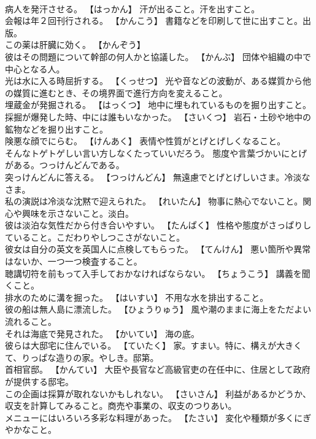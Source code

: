 \documentclass[8pt]{extreport}
\begin{document}
\begin{CJK}{UTF8}{min}
\\	病人を発汗させる。	【はっかん】 汗が出ること。汗を出すこと。
\\	会報は年２回刊行される。	【かんこう】 書籍などを印刷して世に出すこと。出版。
\\	この薬は肝臓に効く。	【かんぞう】 
\\	彼はその問題について幹部の何人かと協議した。	【かんぶ】 団体や組織の中で中心となる人。
\\	光は水に入る時屈折する。	【くっせつ】 光や音などの波動が、ある媒質から他の媒質に進むとき、その境界面で進行方向を変えること。
\\	埋蔵金が発掘される。	【はっくつ】 地中に埋もれているものを掘り出すこと。
\\	採掘が爆発した時、中には誰もいなかった。	【さいくつ】 岩石・土砂や地中の鉱物などを掘り出すこと。
\\	険悪な顔でにらむ。	【けんあく】 表情や性質がとげとげしくなること。
\\	そんなトゲトゲしい言い方しなくたっていいだろう。	態度や言葉づかいにとげがある。つっけんどんである。
\\	突っけんどんに答える。	【つっけんどん】 無遠慮でとげとげしいさま。冷淡なさま。
\\	私の演説は冷淡な沈黙で迎えられた。	【れいたん】 物事に熱心でないこと。関心や興味を示さないこと。淡白。
\\	彼は淡泊な気性だから付き合いやすい。	【たんぱく】 性格や態度がさっぱりしていること。こだわりやしつこさがないこと。
\\	彼女は自分の英文を英国人に点検してもらった。	【てんけん】 悪い箇所や異常はないか、一つ一つ検査すること。
\\	聴講切符を前もって入手しておかなければならない。	【ちょうこう】 講義を聞くこと。
\\	排水のために溝を掘った。	【はいすい】 不用な水を排出すること。
\\	彼の船は無人島に漂流した。	【ひょうりゅう】 風や潮のままに海上をただよい流れること。
\\	それは海底で発見された。	【かいてい】 海の底。
\\	彼らは大邸宅に住んでいる。	【ていたく】 家。すまい。特に、構えが大きくて、りっぱな造りの家。やしき。邸第。
\\	首相官邸。	【かんてい】 大臣や長官など高級官吏の在任中に、住居として政府が提供する邸宅。
\\	この企画は採算が取れないかもしれない。	【さいさん】 利益があるかどうか、収支を計算してみること。商売や事業の、収支のつりあい。
\\	メニューにはいろいろ多彩な料理があった。	【たさい】 変化や種類が多くにぎやかなこと。

\end{CJK}
\end{document}
